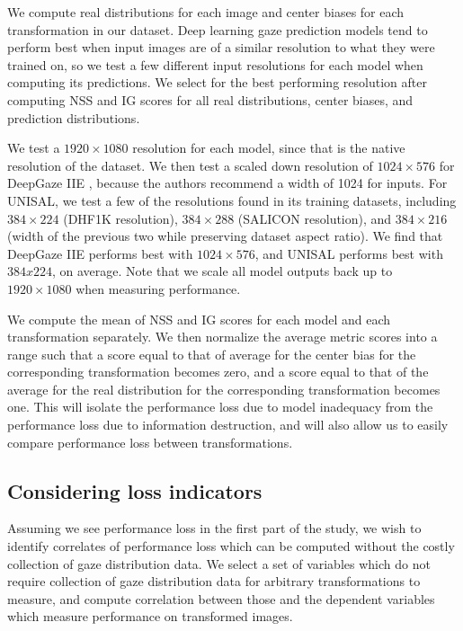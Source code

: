 We compute real distributions for each image and center biases for each transformation in our dataset. Deep learning gaze prediction models tend to perform best when input images are of a similar resolution to what they were trained on, so we test a few different input resolutions for each model when computing its predictions. We select for the best performing resolution after computing NSS and IG scores for all real distributions, center biases, and prediction distributions.

We test a $1920\times1080$ resolution for each model, since that is the native resolution of the dataset. We then test a scaled down resolution of $1024\times576$ for DeepGaze IIE \cite{deepgazeiie}, because the authors recommend a width of 1024 for inputs. For UNISAL, we test a few of the resolutions found in its training datasets, including $384\times224$ (DHF1K \cite{dhf1k} resolution), $384\times288$ (SALICON \cite{salicon} resolution), and $384\times216$ (width of the previous two while preserving dataset aspect ratio). We find that DeepGaze IIE performs best with $1024\times576$, and UNISAL performs best with $384x224$, on average. Note that we scale all model outputs back up to $1920\times1080$ when measuring performance.

We compute the mean of NSS and IG scores for each model and each transformation separately. We then normalize the average metric scores into a range such that a score equal to that of average for the center bias for the corresponding transformation becomes zero, and a score equal to that of the average for the real distribution for the corresponding transformation becomes one. This will isolate the performance loss due to model inadequacy from the performance loss due to information destruction, and will also allow us to easily compare performance loss between transformations.

\subsection{Considering loss indicators}

Assuming we see performance loss in the first part of the study, we wish to identify correlates of performance loss which can be computed without the costly collection of gaze distribution data. We select a set of variables which do not require collection of gaze distribution data for arbitrary transformations to measure, and compute correlation between those and the dependent variables which measure performance on transformed images.

